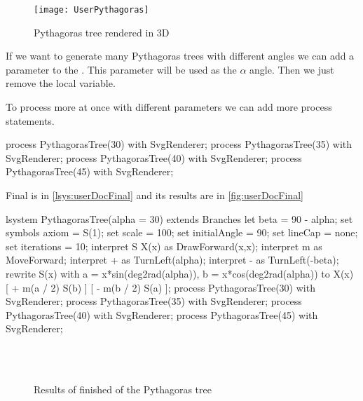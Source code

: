 \begin{figure}[p]
	\centering
	\texttt{[image: UserPythagoras]}
	\caption{Pythagoras tree rendered in 3D}
	\label{fig:UserPythagoras3D}
\end{figure}


If we want to generate many Pythagoras trees with different angles we can add a parameter to the \lsystem.
This parameter will be used as the $\alpha$ angle.
Then we just remove the local variable.

\begin{Lsystem}
lsystem PythagorasTree(alpha = 30) extends Branches{
\end{Lsystem}

To process more \lsystems at once with different parameters we can add more process statements.

\begin{Lsystem}
process PythagorasTree(30) with SvgRenderer;
process PythagorasTree(35) with SvgRenderer;
process PythagorasTree(40) with SvgRenderer;
process PythagorasTree(45) with SvgRenderer;
\end{Lsystem}

Final \lsystem is in \autoref{lsys:userDocFinal} and its results are in \autoref{fig:userDocFinal}

\begin{Lsystem}[label=lsys:userDocFinal,caption={Final \lsystem of the Pythagoras tree}]
lsystem PythagorasTree(alpha = 30) extends Branches{
	let beta = 90 - alpha;
	set symbols axiom = S(1);
	set scale = 100;
	set initialAngle = 90;
	set lineCap = none;
	set iterations = 10;
	interpret S X(x) as DrawForward(x,x);
	interpret m as MoveForward;
	interpret + as TurnLeft(alpha);
	interpret - as TurnLeft(-beta);
	rewrite S(x)
		with a = x*sin(deg2rad(alpha)), b = x*cos(deg2rad(alpha))
		to X(x) [ + m(a / 2) S(b) ] [ - m(b / 2) S(a) ];
}
process PythagorasTree(30) with SvgRenderer;
process PythagorasTree(35) with SvgRenderer;
process PythagorasTree(40) with SvgRenderer;
process PythagorasTree(45) with SvgRenderer;
\end{Lsystem}

\begin{figure}[p]
	\centering
	 ~
	\\
	 ~
	\caption{Results of finished \lsystem of the Pythagoras tree}
	\label{fig:userDocFinal}
\end{figure}






















